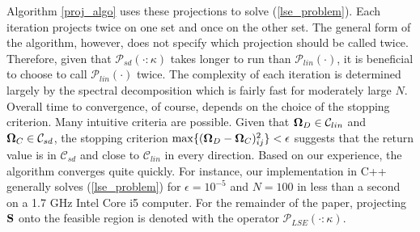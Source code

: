 \documentclass[11pt]{article}
\theoremstyle{definition}
\theoremstyle{definition}
\def\bOmega{{\bf \Omega}}
\def\SS{{\bf S}}
\begin{document}
 Algorithm \ref{proj_algo} uses these projections to solve (\ref{lse_problem}).  Each iteration projects twice on one set and once on the other set. The general form of the algorithm, however, does not specify which projection should be called twice. Therefore, given that $\mathcal{P}_{sd}(\cdot:\kappa)$ takes longer to run than $\mathcal{P}_{lin}(\cdot)$, it is beneficial to choose to call $\mathcal{P}_{lin}(\cdot)$ twice. The complexity of each iteration is determined largely by the spectral decomposition which is fairly fast for moderately large $N$. Overall time to convergence, of course, depends on the choice of the stopping criterion. Many intuitive criteria are possible. Given that $\bOmega_D \in \mathcal{C}_{lin}$ and $\bOmega_C \in \mathcal{C}_{sd}$, the stopping criterion $\max \{(\bOmega_{D}-\bOmega_{C})_{ij}^2\} < \epsilon$ suggests that the return value is in $\mathcal{C}_{sd}$ and close to $\mathcal{C}_{lin}$ in every direction. Based on our experience, the algorithm converges quite quickly. For instance, our implementation in C++ generally solves (\ref{lse_problem}) for $\epsilon = 10^{-5}$ and $N = 100$  in less than a second on a 1.7 GHz Intel Core i5 computer.  For the remainder of the paper, projecting $\SS$ onto the feasible region is denoted with the operator $\mathcal{P}_{LSE}(\cdot : \kappa)$.
 
 
% 
% 

% 
  
\end{document}
